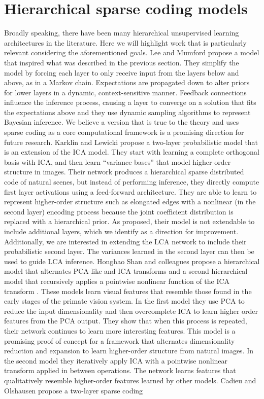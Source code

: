 \section{Hierarchical sparse coding models}\label{sec:ch3_related_models}
Broadly speaking, there have been many hierarchical unsupervised learning architectures in the literature. Here we will highlight work that is particularly relevant considering the aforementioned goals. Lee and Mumford \citeyearpar{lee2003hierarchical} propose a model that inspired what was described in the previous section. They simplify the model by forcing each layer to only receive input from the layers below and above, as in a Markov chain. Expectations are propagated down to alter priors for lower layers in a dynamic, context-sensitive manner. Feedback connections influence the inference process, causing a layer to converge on a solution that fits the expectations above and they use dynamic sampling algorithms to represent Bayesian inference. We believe a version that is true to the theory and uses sparse coding as a core computational framework is a promising direction for future research. Karklin and Lewicki \citeyearpar{karklin2003learning} propose a two-layer probabilistic model that is an extension of the ICA model. They start with learning a complete orthogonal basis with ICA, and then learn ``variance bases'' that model higher-order structure in images. Their network produces a hierarchical sparse distributed code of natural scenes, but instead of performing inference, they directly compute first layer activations using a feed-forward architecture. They are able to learn to represent higher-order structure such as elongated edges with a nonlinear (in the second layer) encoding process because the joint coefficient distribution is replaced with a hierarchical prior. As proposed, their model is not extendable to include additional layers, which we identify as a direction for improvement. Additionally, we are interested in extending the LCA network to include their probabilistic second layer. The variances learned in the second layer can then be used to guide LCA inference. Honghao Shan and colleagues propose a hierarchical model that alternates PCA-like and ICA transforms \parencite{shan2013efficient} and a second hierarchical model that recursively applies a pointwise nonlinear function of the ICA transform \citeyearpar{shan2007recursive}. These models learn visual features that resemble those found in the early stages of the primate vision system. In the first model they use PCA to reduce the input dimensionality and then overcomplete ICA \parencite{le2011ica} to learn higher order features from the PCA output. They show that when this process is repeated, their network continues to learn more interesting features. This model is a promising proof of concept for a framework that alternates dimensionality reduction and expansion to learn higher-order structure from natural images. In the second model they iteratively apply ICA with a pointwise nonlinear transform applied in between operations. The network learns features that qualitatively resemble higher-order features learned by other models. Cadieu and Olshausen \citeyearpar{cadieu2008learning} propose a two-layer sparse coding 